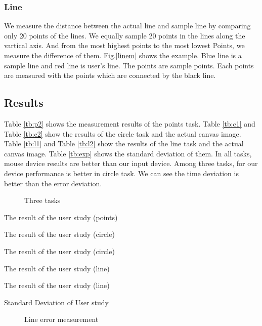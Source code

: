 \subsubsection{Line}
We measure the distance between the actual line and sample line by comparing only 20 points of the lines. We equally sample 20 points in the lines along the vartical axis. And from the most highest points to the most lowest Points, we measure the difference of them.
Fig.\ref{linem} shows the example. Blue line is a sample line and red line is user's line. The points are sample points. Each points are measured with the points which are connected by the black line.
\subsection{Results}
Table \ref{tb:p2} shows the measurement results of the points task. Table \ref{tb:c1} and Table \ref{tb:c2} show the results of the circle task and the actual canvas image. Table \ref{tb:l1} and Table \ref{tb:l2} show the results of the line task and the actual canvas image. Table \ref{tb:exp} shows the standard deviation of them. In all tasks, mouse device results are better than our input device. Among three tasks, for our device performance is better in circle task. We can see the time deviation is better than the error deviation.
\begin{figure}

 \caption{Three tasks}
 \label{task}
\end{figure}

\begin{table}[htbp]
 \centering
 \caption{The result of the user study (points)}
 \label{tb:p2}
 
\end{table}


\begin{table}[htbp]
 \centering
 \caption{The result of the user study (circle)}
 \label{tb:c1}
 
\end{table}



\begin{table}[htbp]
 \centering
 \caption{The result of the user study (circle)}
 \label{tb:c2}
 
\end{table}

\begin{table}[htbp]
 \centering
 \caption{The result of the user study (line)}
 \label{tb:l1}
 
\end{table}


\begin{table}[htbp]
 \centering
 \caption{The result of the user study (line)}
 
 \label{tb:l2}
\end{table}




\begin{table}[htbp]
 \centering
 \caption{Standard Deviation of User study}
 \label{tb:exp}
 
\end{table}
\begin{figure}[htbp]
 \centering
 
 \caption{Line error measurement}
\end{figure}
